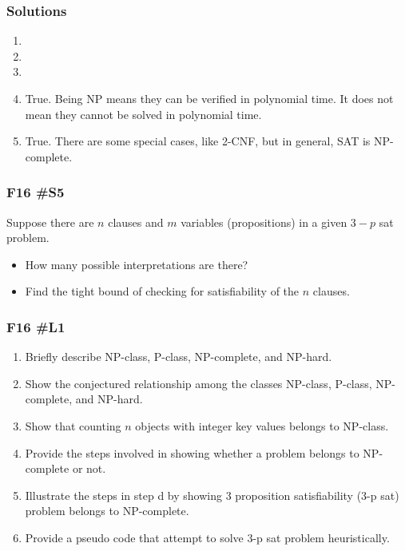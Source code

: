 \subsubsection{Solutions}

\begin{enumerate}[label=\alph*.]
	\item
	\item
	\item
	\item  True.  Being NP means they can be verified in polynomial time.  It does not mean they cannot be solved in polynomial time.  
	\item  True.  There are some special cases, like 2-CNF, but in general, SAT is NP-complete.
\end{enumerate}

\subsubsection{F16 \#S5}

Suppose there are $n$ clauses and $m$ variables (propositions) in a given $3-p$ sat problem.
\begin{itemize}
	\item How many possible interpretations are there?
	\item Find the tight bound of checking for satisfiability of the $n$ clauses.  
\end{itemize}

\subsubsection{F16 \#L1}

\begin{enumerate}
	\item Briefly describe NP-class, P-class, NP-complete, and NP-hard.
	\item Show the conjectured relationship among the classes NP-class, P-class, NP-complete, and NP-hard.
	\item Show that counting $n$ objects with integer key values belongs to NP-class.  
	\item Provide the steps involved in showing whether a problem belongs to NP-complete or not.
	\item Illustrate the steps in step d by showing 3 proposition satisfiability (3-p sat) problem belongs to NP-complete.
	\item Provide a pseudo code that attempt to solve 3-p sat problem heuristically.
\end{enumerate}

